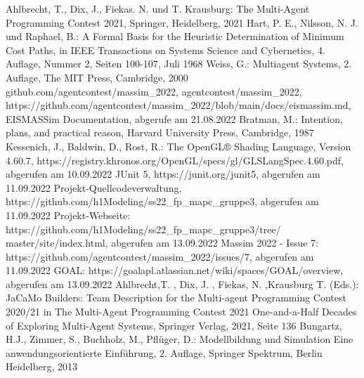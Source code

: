 \documentclass[runningheads]{llncs}
\begin{document}
	
	\begin{thebibliography}{8}
		Ahlbrecht, T., Dix, J., Fiekas. N. und T. Krausburg: The Multi-Agent Programming Contest 2021, Springer, Heidelberg, 2021
		Hart, P. E., Nilsson, N. J. und Raphael, B.: A Formal Basis for the Heuristic Determination of Minimum Cost Paths, in IEEE Transactions on Systems Science and Cybernetics, 4. Auflage, Nummer 2, Seiten 100-107, Juli 1968
		Weiss, G.: Multiagent Systems, 2. Auflage, The MIT Press, Cambridge, 2000
		github.com/agentcontest/massim\_2022, agentcontest/massim\_2022, \\ https://github.com/agentcontest/massim\_2022/blob/main/docs/eismassim.md, EISMASSim Documentation, abgerufe am 21.08.2022
		Bratman, M.: Intention, plans, and practical reason, Harvard University Press, Cambridge, 1987
		Kessenich, J., Baldwin, D., Rost, R.: The OpenGL® Shading Language, Version 4.60.7, https://registry.khronos.org/OpenGL/specs/gl/GLSLangSpec.4.60.pdf, abgerufen am 10.09.2022
		JUnit 5, https://junit.org/junit5, abgerufen am 11.09.2022
		Projekt-Quellcodeverwaltung, https://github.com/h1Modeling/ss22\_fp\_mapc\_gruppe3, abgerufen am 11.09.2022
		Projekt-Webseite: https://github.com/h1Modeling/ss22\_fp\_mapc\_gruppe3/tree/ master/site/index.html, abgerufen am 13.09.2022
		Massim 2022 - Issue 7: https://github.com/agentcontest/massim\_2022/issues/7, abgerufen am 11.09.2022
		GOAL: https://goalapl.atlassian.net/wiki/spaces/GOAL/overview, abgerufen am 13.09.2022
		Ahlbrecht,T. , Dix, J. , Fiekas, N. ,Krausburg T. (Eds.): JaCaMo Builders: Team Description for the Multi-agent Programming Contest 2020/21  in The Multi-Agent Programming Contest 2021 One-and-a-Half Decades of Exploring Multi-Agent Systems, Springer Verlag, 2021, Seite 136
		Bungartz, H.J., Zimmer, S., Buchholz, M., Pflüger, D.: Modellbildung und Simulation Eine anwendungsorientierte Einführung, 2. Auflage, Springer Spektrum, Berlin Heidelberg, 2013
		
	\end{thebibliography}
\end{document}
